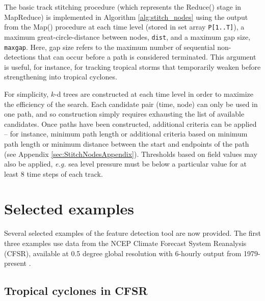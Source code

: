 \documentclass[gmdd, hvmath, online]{copernicus_discussions}
\begin{document}
The basic track stitching procedure (which represents the Reduce() stage in MapReduce) is implemented in Algorithm \ref{alg:stitch_nodes} using the output from the Map() procedure at each time level (stored in set array \texttt{P[1..T]}), a maximum great-circle-distance between nodes, \texttt{dist}, and a maximum gap size, \texttt{maxgap}.  Here, gap size refers to the maximum number of sequential non-detections that can occur before a path is considered terminated.  This argument is useful, for instance, for tracking tropical storms that temporarily weaken before strengthening into tropical cyclones.

For simplicity, $k$-d trees are constructed at each time level in order to maximize the efficiency of the search.  Each candidate pair (time, node) can only be used in one path, and so construction simply requires exhausting the list of available candidates.  Once paths have been constructed, additional criteria can be applied -- for instance, minimum path length or additional criteria based on minimum path length or minimum distance between the start and endpoints of the path (see Appendix \ref{sec:StitchNodesAppendix}).  Thresholds based on field values may also be applied, \textit{e.g.} sea level pressure must be below a particular value for at least 8 time steps of each track.

\section{Selected examples} \label{sec:SelectedExamples}

Several selected examples of the feature detection tool are now provided.  The first three examples use data from the NCEP Climate Forecast System Reanalysis (CFSR), available at 0.5 degree global resolution with 6-hourly output from 1979-present \citep{saha2010ncep}.

\subsection{Tropical cyclones in CFSR} \label{sec:TropicalCycloneExample}
\end{document}
